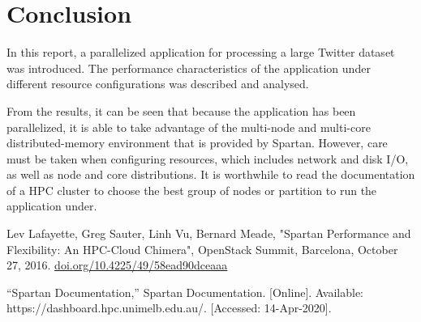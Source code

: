 \documentclass[10pt]{article}
\begin{document}
\section{Conclusion}
In this report, a parallelized application for processing a large Twitter dataset was introduced. The performance characteristics of the application under different resource configurations was described and analysed. %

From the results, it can be seen that because the application has been parallelized, it is able to take advantage of the multi-node and multi-core distributed-memory environment that is provided by Spartan. 
However, care must be taken when configuring resources, which includes network and disk I/O,  as well as node and core distributions.
It is worthwhile to read the documentation of a HPC cluster to choose the best group of nodes or partition to run the application under. 


\begin{thebibliography}{9}
Lev Lafayette, Greg Sauter, Linh Vu, Bernard Meade, "Spartan Performance and Flexibility: An HPC-Cloud Chimera", OpenStack Summit, Barcelona, October 27, 2016. \href{http://doi.org/10.4225/49/58ead90dceaaa}{doi.org/10.4225/49/58ead90dceaaa}

“Spartan Documentation,” Spartan Documentation. [Online]. Available: https://dashboard.hpc.unimelb.edu.au/. [Accessed: 14-Apr-2020].
\end{thebibliography}
\end{document}
